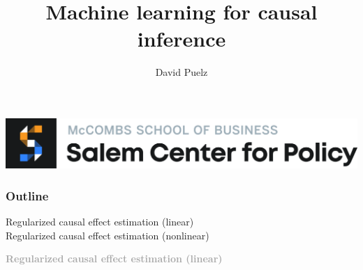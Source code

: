 \documentclass{beamer}
\title[]{\Large{Machine learning for causal inference} \vspace{5mm}}
\author{David Puelz}
\institute[] %
{

}
\date{} %
\newcommand{\bo}[1]{\textcolor{burntorange}{#1}}
\newcommand{\dg}[1]{\textcolor{darkgray}{#1}}
\newcommand{\sk}{\vspace{.5cm}}
\begin{document}
{
\begin{frame}[noframenumbering]
\vspace{12mm}
\centerline{\includegraphics[scale=0.075]{salem-banner}}
\vspace{5mm}
\titlepage %
\end{frame}
}







\begin{frame}
	\frametitle{Outline}
	
	\vspace{8mm}
Regularized causal effect estimation (linear) \\
	$$$$
Regularized causal effect estimation (nonlinear) \\
\end{frame}



\begin{frame}

\sk\sk
	\dg{\large \bf Regularized causal effect estimation (\bo{linear})}
\end{frame}
\end{document}
